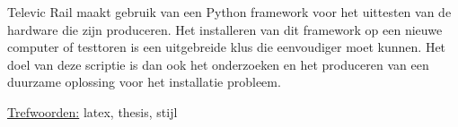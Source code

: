 Televic Rail maakt gebruik van een Python framework voor het uittesten van de hardware die zijn produceren.
Het installeren van dit framework op een nieuwe computer of testtoren is een uitgebreide klus die eenvoudiger moet kunnen.
Het doel van deze scriptie is dan ook het onderzoeken en het produceren van een duurzame oplossing voor het installatie probleem.


\underline{Trefwoorden:} latex, thesis, stijl